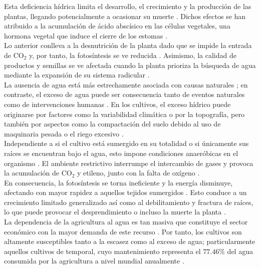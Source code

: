 \begin{itemize}[leftmargin=0cm, itemsep=0.5 cm]
Esta deficiencia hídrica limita el desarrollo, el crecimiento y la producción de las plantas, llegando potencialmente a ocasionar su muerte \cite{Ngoune_2020}. Dichos efectos se han atribuido a la acumulación de ácido abscísico en las células vegetales, una hormona vegetal que induce el cierre de los estomas \cite{Li_2014}.\\

Lo anterior conlleva a la desnutrición de la planta dado que se impide la entrada de CO$_2$ y, por tanto, la fotosíntesis se ve reducida \cite{Gahir_2021}. Asimismo, la calidad de productos y semillas se ve afectada cuando la planta prioriza la búsqueda de agua mediante la expansión de su sistema radicular \cite{Comas_2013}.\\

La ausencia de agua está más estrechamente asociada con causas naturales \cite{AghaKouchak_2021}; en contraste, el exceso de agua puede ser consecuencia tanto de eventos naturales como de intervenciones humanas \cite{Patra_2024}. En los cultivos, el exceso hídrico puede originarse por factores como la variabilidad climática o por la topografía, pero también por aspectos como la compactación del suelo debido al uso de maquinaria pesada o el riego excesivo \cite{Patra_2024}.\\

Independiente a si el cultivo está sumergido en su totalidad o si únicamente sus raíces se encuentran bajo el agua, esto impone condiciones anaeróbicas en el organismo \cite{Striker_2012}. El ambiente restrictivo interrumpe el intercambio de gases y provoca la acumulación de CO$_2$ y etileno, junto con la falta de oxígeno \cite{Ngoune_2020}.\\

En consecuencia, la fotosíntesis se torna ineficiente y la energía disminuye, afectando con mayor rapidez a aquellos tejidos sumergidos \cite{Vartapetian_1997}. Esto conduce a un crecimiento limitado generalizado así como al debilitamiento y fractura de raíces, lo que puede provocar el desprendimiento o incluso la muerte la planta \cite{Patra_2024}.\\

La dependencia de la agricultura al agua es tan masiva que constituye el sector económico con la mayor demanda de este recurso \cite{Rockstrom_2010}. Por tanto, los cultivos son altamente susceptibles tanto a la escasez como al exceso de agua; particularmente aquellos cultivos de temporal, cuyo mantenimiento representa el $77.46\%$ del agua consumida por la agricultura a nivel mundial anualmente \cite{deFraiture_2007}.




\end{itemize}
